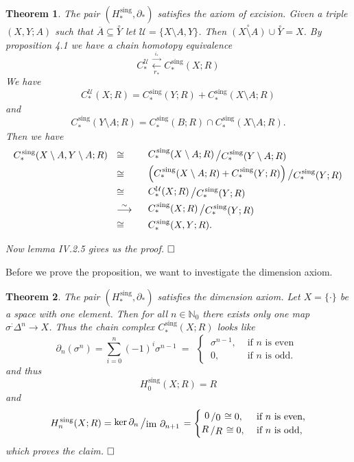 \documentclass[11pt]{book}
\numberwithin{dummy}{section}
\newtheorem{theorem}{Theorem}[section]
\theoremstyle{nonumberbreak}
\newenvironment{pr}[1][]{\ifthenelse{\equal{#1}{}}{\proof}{\proof[#1]}\rm}{\endproof}
\newcommand{\la}{\longrightarrow}
\newcommand{\Cs}{C^{\hspace{1pt}\mathrm{sing}}}
\newcommand{\Hs}{H^{\hspace{1pt}\mathrm{sing}}}
\newcommand{\slant}[2]{{\raisebox{.1em}{$#1$}\left/\raisebox{-.1em}{$#2$}\right.}}
\begin{document}
\begin{spacing}{1.4}
\begin{theorem}
The pair $(\Hs_*, \partial_*)$ satisfies the axiom of excision.
\begin{pr}
Given a triple $(X,Y;A)$ such that $\overline{A} \subseteq \overset{\circ}{Y}$ let $\mathcal{U} = \{ X \setminus A, Y\}$. Then $\overset{\circ}{(X \setminus A)} \cup \overset{\circ}{Y} =X$. By proposition 4.1 we have a chain homotopy equivalence
$$C_*^{\mathcal{U}} \overset{\overset{i_*}{\la}}{\underset{r_*}{\longleftarrow}} \Cs_*(X;R)$$
We have
$$C_*^{\mathcal{U}}(X;R) = \Cs_*(Y;R) + \Cs_*(X \setminus A;R)$$
and 
$$\Cs_*(Y \setminus A;R) = \Cs_*(B;R) \cap \Cs_*(X\setminus A;R).$$
Then we have
\begin{alignat*}{5}
\Cs_*( X \setminus A, Y \setminus A;R) \ \ &\cong&& \ \ \slant{\Cs_*(X \setminus A;R)}{\Cs_*(Y\setminus A;R)} \\
&\cong&& \ \ \slant{\left( \Cs_*(X \setminus A;R) + \Cs_*(Y;R)\right)}{\Cs_*(Y;R)} \\
&\cong&& \ \ \slant{C_*^{\mathcal{U}}(X;R)}{\Cs_*(Y;R)} \\
& \overset{\sim}{\la}&& \ \ \slant{\Cs_*(X;R)}{\Cs_*(Y;R)}\\
&\cong&& \ \ \Cs_*(X,Y;R).
\end{alignat*}

Now lemma IV.2.5 gives us the proof. $\hfill \Box$
\end{pr}
\end{theorem}


Before we prove the proposition, we want to investigate the dimension axiom.

\begin{theorem}
The pair $(\Hs_*, \partial_*)$ satisfies the dimension axiom.
\begin{pr}
Let $X= \{ \cdot \}$ be a space with one element. Then for all $n \in \mathbb{N}_0$ there exists only one map $\sigma^: \Delta^n \la X$. Thus the chain complex $\Cs_*(X;R)$ looks like
$$\partial_n(\sigma^n) = \sum_{i=0}^n (-1)^{i} \sigma^{n-1}  \ = \ \ \begin{cases} \ \sigma^{n-1}, &  \textrm{ if } n \textrm{ is even } \\  \ 0, & \textrm{ if } n \textrm{ is odd. } \end{cases}$$
and thus
$$\Hs_0(X;R) = R$$
and 
$$\Hs_n(X;R) = \slant{ \ker \partial_n}{\mathrm{im} \ \partial_{n+1}} = \begin{cases} \ \slant{0}{0} \cong 0, & \textrm{ if } n \textrm{ is even,} \\ \slant{R}{R} \cong 0, &\textrm{ if } n \textrm{ is odd,} \end{cases}$$
which proves the claim. $\hfill \Box$


\end{pr}
\end{theorem}
\end{spacing}
\end{document}
